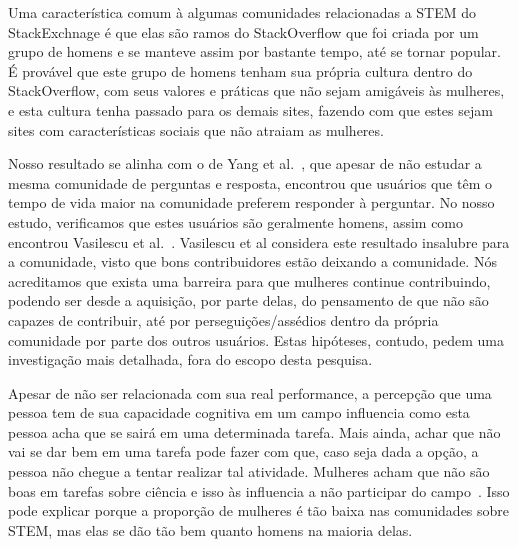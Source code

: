 
Uma característica comum à algumas comunidades relacionadas a STEM do StackExchnage é que elas são ramos do StackOverflow que foi criada por um grupo de homens e se manteve assim por bastante tempo, até se tornar popular. É provável que este grupo de homens tenham sua própria cultura dentro do StackOverflow, com seus valores e práticas que não sejam amigáveis às mulheres, e esta cultura tenha passado para os demais sites, fazendo com que estes sejam sites com características sociais que não atraiam as mulheres.

Nosso resultado se alinha com o de Yang et al.~\cite{yang2010activity}, que apesar de não estudar a mesma comunidade de perguntas e resposta, encontrou que usuários que têm o tempo de vida maior na comunidade preferem responder à perguntar. No nosso estudo, verificamos que estes usuários são geralmente homens, assim como encontrou Vasilescu et al.~\cite{Vasilescu27092013}. Vasilescu et al considera este resultado insalubre para a comunidade, visto que bons contribuidores estão deixando a comunidade. Nós acreditamos que exista uma barreira para que mulheres continue contribuindo, podendo ser desde a aquisição, por parte delas, do pensamento de que não são capazes de contribuir, até por perseguições/assédios dentro da própria comunidade por parte dos outros usuários. Estas hipóteses, contudo, pedem uma investigação mais detalhada, fora do escopo desta pesquisa.

Apesar de não ser relacionada com sua real performance, a percepção que uma pessoa tem de sua capacidade cognitiva em um campo influencia como esta pessoa acha que se sairá em uma determinada tarefa. Mais ainda, achar que não vai se dar bem em uma tarefa pode fazer com que, caso seja dada a opção, a pessoa não chegue a tentar realizar tal atividade. Mulheres acham que não são boas em tarefas sobre ciência e isso às influencia a não participar do campo~\cite{ehrlinger2003chronic}. Isso pode explicar porque a proporção de mulheres é tão baixa nas comunidades sobre STEM, mas elas se dão tão bem quanto homens na maioria delas.


